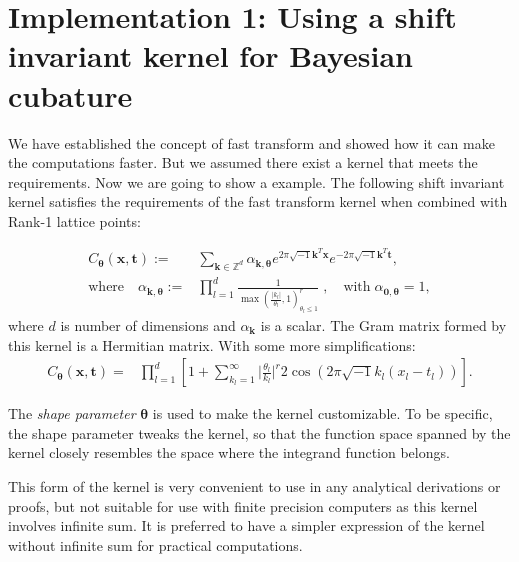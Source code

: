 \documentclass[smallextended]{svjour3}       %
\newcommand{\bm}[1]{\boldsymbol{#1}}
\newcommand{\vtheta}{{\bm{\theta}}}
\newcommand{\vk}{\bm{k}}
\newcommand{\vt}{\bm{t}}
\newcommand{\vx}{\bm{x}}
\begin{document}
\section{Implementation 1: Using a shift invariant kernel for Bayesian cubature}
\label{sec:shift_invariant_kernel}
We have established the concept of fast transform and showed how it can make the computations faster. But we assumed there exist a kernel that meets the requirements.
Now we are going to show a example.
The following shift invariant kernel satisfies the requirements of the fast transform kernel when combined with Rank-1 lattice points:

\begin{align}
\label{bayes_SI_kernel}
C_\vtheta(\vx, \vt) := &  \sum_{\vk \in \mathbb{Z}^d} \alpha_{\vk,\vtheta}  e^{2 \pi\sqrt{-1} \vk^T\vx}
e^{-2 \pi\sqrt{-1} \vk^T\vt},
\\
\nonumber
\text{where} \quad
\alpha_{\vk,\vtheta} := & \prod_{l=1}^d \frac{1}{\max(\frac{|k_l|}{\theta_l},1)^r_{\theta_l\leq 1}}  \;,  \quad \text{with} \; {\alpha}_{\bm{0},\vtheta} = 1,
\end{align}
where $d$ is number of dimensions and $\alpha_{\vk}$ is a scalar. The Gram matrix formed by this kernel is a Hermitian matrix. 
With some more simplifications:
\begin{align*}
C_\vtheta(\vx, \vt) = & \prod_{l=1}^d  
\left[ 1 +
\sum_{k_l=1}^\infty
\Big|\frac{\theta_l}{k_l}\Big|^r 
2 \cos({2 \pi\sqrt{-1} k_l(x_l - t_l )})
\right].
\end{align*}

The \textit{shape parameter} $\vtheta$ is used to make the kernel customizable. To be specific, the {shape parameter} tweaks the kernel, so that the function space spanned by the kernel closely resembles the space where the integrand function belongs.

This form of the kernel is very convenient to use in any analytical derivations or proofs, but not suitable for use with finite precision computers as this kernel involves infinite sum. It is preferred to have a simpler expression of the kernel without infinite sum for practical computations. 
\end{document}
